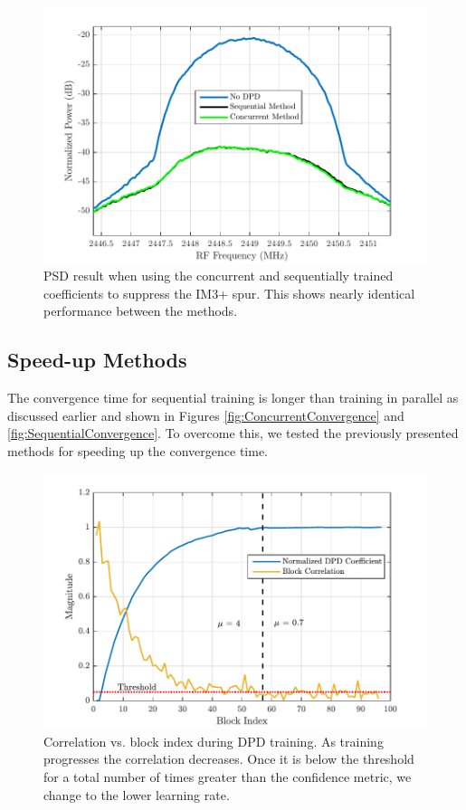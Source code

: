 \begin{figure}[t!] 
	\centering
	\includegraphics[width=0.9\columnwidth]{IterativeSpectrumvsConcurrent}
	\caption{PSD result when using the concurrent and sequentially trained coefficients to suppress the IM3+ spur. 
		This shows nearly identical performance between the methods.}
	\label{fig:IterativeSpectrumvsConcurrent}
\end{figure}

\subsection{Speed-up Methods}
The convergence time for sequential training is longer than training in parallel as discussed earlier and shown in Figures \ref{fig:ConcurrentConvergence} and \ref{fig:SequentialConvergence}. 
To overcome this, we tested the previously presented methods for speeding up the convergence time.

\begin{figure}[t] 
	\centering
	\includegraphics[width=\columnwidth]{Convergence_Mu_new}
	\caption{Correlation vs. block index during DPD training. 
		As training progresses the correlation decreases. 
		Once it is below the threshold for a total number of times greater than the confidence metric, we change to the lower learning rate.}
	\label{fig:Convergence_Mu}
\end{figure}

